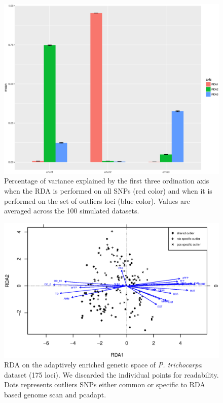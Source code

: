 \documentclass[a4paper,times,10pt,authoryear]{article}%
\begin{document}
\begin{figure}[t]
\begin{center}
\includegraphics[height=0.4\textheight]{figures/R2.eps}
\end{center}
\caption{Percentage of variance explained by the first three ordination axis when the RDA is performed on all SNPs (red color) and when it is performed on the set of outliers loci (blue color). Values are averaged across the 100 simulated datasets.}%
\label{fig:R2}%
\end{figure}

\begin{figure}[t]
\begin{center}
\includegraphics[height=0.4\textheight]{figures/poplar_rda.eps}
\end{center}
\caption{RDA on the adaptively enriched genetic space of \textit{P. trichocarpa} dataset (175 loci). We discarded the individual points for readability. Dots represents outliers SNPs either common or specific to RDA based genome scan and pcadapt.}%
\label{fig:poplar_rda}%
\end{figure}
\end{document}
